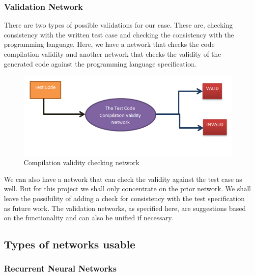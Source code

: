 \documentclass[conference, onecolumn, a4, 12pt]{IEEEtran}
\begin{document}
\subsubsection{Validation Network}
There are two types of possible validations for our case. These are, checking consistency with the written test case and checking the consistency with the programming language. Here, we have a network that checks the code compilation validity and another network that checks the validity of the generated code against the programming language specification.

\begin{figure}
	\includegraphics[width=\linewidth]{Compilation_validity.png}
	\caption{Compilation validity checking network}
	\label{fig4}
\end{figure}

We can also have a network that can check the validity against the test case as well. But for this project we shall only concentrate on the prior network. We shall leave the possibility of adding a check for consistency with the test specification as future work. The validation networks, as specified here, are suggestions based on the functionality and can also be unified if necessary.

\subsection{Types of networks usable}

\subsubsection{Recurrent Neural Networks}
\end{document}
